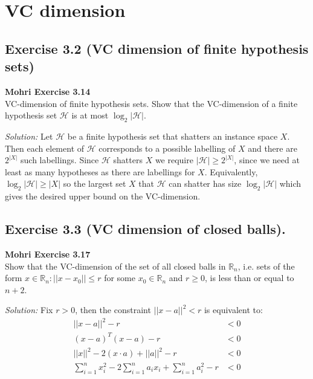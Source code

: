 \documentclass[
10pt, %
a4paper, %
oneside, %
headinclude,footinclude, %
BCOR5mm, %
]{scrartcl}
\newenvironment{problem}[2][]
               { \begin{mdframed}[backgroundcolor=gray!20] \textbf{#1 #2} \\}
               {  \end{mdframed}}
\newenvironment{solution}
               {\textit{Solution:}}
               {}
\begin{document}
\section{VC dimension}

\subsection*{Exercise 3.2 (VC dimension of finite hypothesis sets)}
\begin{problem}{Mohri Exercise 3.14}
VC-dimension of finite hypothesis sets. Show that the VC-dimension of a finite hypothesis set $\mathcal{H}$ is at most $\log_2|\mathcal{H}|$.
\end{problem}

\begin{solution}
  Let $\mathcal{H}$ be a finite hypothesis set that shatters an instance space $X$. Then each element of $\mathcal{H}$ corresponds to a possible labelling of $X$ and there are $2^{|X|}$ such labellings. Since $\mathcal{H}$ shatters $X$ we require $|\mathcal{H}| \geq 2^{|X|}$, since we need at least as many hypotheses as there are labellings for $X$. Equivalently, $\log_2{|\mathcal{H}|} \geq |X|$ so the largest set $X$ that $\mathcal{H}$ can shatter has size $\log_2 |\mathcal{H}|$ which gives the desired upper bound on the VC-dimension.
\end{solution}

\subsection*{Exercise 3.3 (VC dimension of closed balls).}
\begin{problem}{Mohri Exercise 3.17}
Show that the VC-dimension of the set of all closed balls in $\mathbb{R}_n$, i.e. sets of the form ${x \in \mathbb{R}_n : ||x-x_0|| \leq r}$ for some $x_0 \in \mathbb{R}_n$ and $r \geq 0$, is less than or equal to $n + 2$.
\end{problem}

\begin{solution}
Fix $r>0$, then the constraint $||x-a||^2<r$ is equivalent to:
\begin{align*}
  ||x-a||^2 - r &< 0 \\
  (x-a)^T(x-a) - r &< 0 \\
  ||x||^2 - 2(x\cdot a) + ||a||^2 - r &< 0 \\
  \sum_{i=1}^n x_i^2 - 2 \sum_{i=1}^n a_i x_i + \sum_{i=1}^n a_i^2 - r &< 0
\end{align*}
\end{solution}
\end{document}
